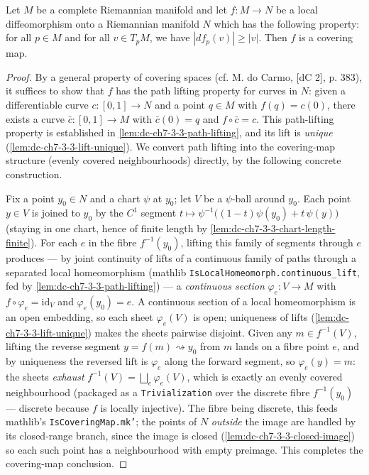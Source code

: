 \begin{lemma}
  \label{lem:dc-ch7-3-3}
  \leanok
  Let $M$ be a complete Riemannian manifold and let $f:M\to N$ be a local
  diffeomorphism onto a Riemannian manifold $N$ which has the following property:
  for all $p\in M$ and for all $v\in T_pM$, we have $|df_p(v)|\ge|v|$. Then $f$ is a
  covering map.
\end{lemma}
\begin{proof}
  \leanok
  By a general property of covering spaces (cf. M. do Carmo, [dC 2],
  p. 383), it suffices to show that $f$ has the path lifting property for curves in
  $N$: given a differentiable curve $c:[0,1]\to N$ and a point $q\in M$ with
  $f(q)=c(0)$, there exists a curve $\bar c:[0,1]\to M$ with $\bar c(0)=q$ and
  $f\circ\bar c=c$. This path-lifting property is established in
  \cref{lem:dc-ch7-3-3-path-lifting}, and its lift is \emph{unique}
  (\cref{lem:dc-ch7-3-3-lift-unique}). We convert path lifting into the covering-map
  structure (evenly covered neighbourhoods) directly, by the following concrete
  construction.

  Fix a point $y_0\in N$ and a chart $\psi$ at $y_0$; let $V$ be a $\psi$-ball around
  $y_0$. Each point $y\in V$ is joined to $y_0$ by the $C^1$ segment
  $t\mapsto\psi^{-1}\big((1-t)\psi(y_0)+t\,\psi(y)\big)$ (staying in one chart, hence
  of finite length by \cref{lem:dc-ch7-3-3-chart-length-finite}). For each $e$ in the
  fibre $f^{-1}(y_0)$, lifting this family of segments through $e$ produces — by joint
  continuity of lifts of a continuous family of paths through a separated local
  homeomorphism (mathlib \texttt{IsLocalHomeomorph.continuous\_lift}, fed by
  \cref{lem:dc-ch7-3-3-path-lifting}) — a \emph{continuous section}
  $\varphi_e:V\to M$ with $f\circ\varphi_e=\mathrm{id}_V$ and $\varphi_e(y_0)=e$. A
  continuous section of a local homeomorphism is an open embedding, so each sheet
  $\varphi_e(V)$ is open; uniqueness of lifts (\cref{lem:dc-ch7-3-3-lift-unique})
  makes the sheets pairwise disjoint. Given any $m\in f^{-1}(V)$, lifting the reverse
  segment $y=f(m)\rightsquigarrow y_0$ from $m$ lands on a fibre point $e$, and by
  uniqueness the reversed lift is $\varphi_e$ along the forward segment, so
  $\varphi_e(y)=m$: the sheets \emph{exhaust} $f^{-1}(V)=\bigsqcup_e\varphi_e(V)$,
  which is exactly an evenly covered neighbourhood (packaged as a
  \texttt{Trivialization} over the discrete fibre $f^{-1}(y_0)$ — discrete because $f$
  is locally injective). The fibre being discrete, this feeds mathlib's
  \texttt{IsCoveringMap.mk'}; the points of $N$ \emph{outside} the image are handled
  by its closed-range branch, since the image is closed
  (\cref{lem:dc-ch7-3-3-closed-image}) so each such point has a neighbourhood with
  empty preimage. This completes the covering-map conclusion.


\end{proof}
